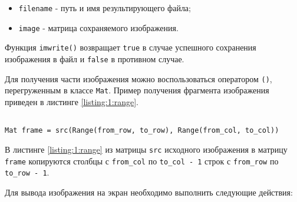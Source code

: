 \begin{itemize}

	\item \verb|filename| - путь и имя результирующего файла;
	\item \verb|image| - матрица сохраняемого изображения.

\end{itemize}

Функция \verb|imwrite()| возвращает \verb|true| в случае успешного сохранения изображения в файл и \verb|false| в противном случае.


Для получения части изображения можно воспользоваться оператором \verb|()|, перегруженным в классе \verb|Mat|. Пример получения фрагмента изображения приведен в листинге \ref{listing:1:range}.

\begin{lstlisting}

Mat frame = src(Range(from_row, to_row), Range(from_col, to_col))

\end{lstlisting}
\mylistingend

В листинге \ref{listing:1:range} из матрицы \verb|src| исходного изображения в матрицу \verb|frame| копируются столбцы с \verb|from_col| по \verb|to_col - 1| строк с \verb|from_row| по \verb|to_row - 1|.


Для вывода изображения на экран необходимо выполнить следующие действия:

